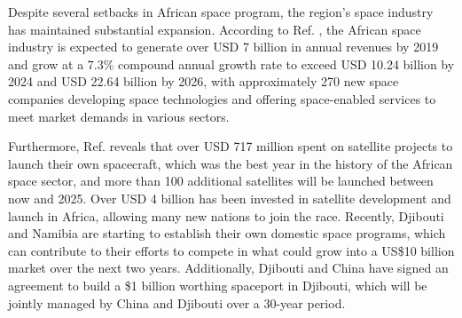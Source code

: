 \documentclass[final,5p,times, twocolumn, sort&compress, sc]{elsarticle}
\begin{document}
Despite several setbacks in African space program, the region's space industry has maintained substantial expansion. According to Ref. \cite{sa2023}, the African space industry is expected to generate over USD 7 billion in annual revenues by 2019 and grow at a 7.3\% compound annual growth rate to exceed USD 10.24 billion by 2024 and USD 22.64 billion by 2026, with approximately 270 new space companies developing space technologies and offering space-enabled services to meet market demands in various sectors. 

Furthermore, Ref. \cite{sa2023} reveals that over USD 717 million spent on satellite projects to launch their own spacecraft, which was the best year in the history of the African space sector, and more than 100 additional satellites will be launched between now and 2025. Over USD 4 billion has been invested in satellite development and launch in Africa, allowing many new nations to join the race. Recently, Djibouti and Namibia are starting to establish their own domestic space programs, which can contribute to their efforts to compete in what could grow into a US\$10 billion market over the next two years. Additionally, Djibouti and China have signed an agreement to build a \$1 billion worthing spaceport in Djibouti, which will be jointly managed by China and Djibouti over a 30-year period.
\end{document}
